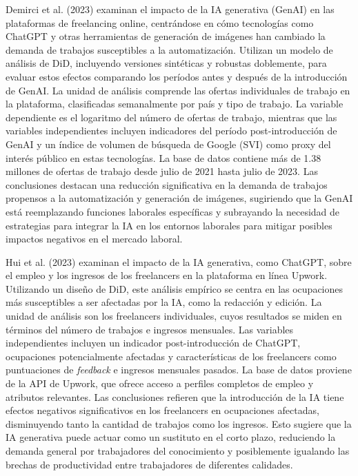 \documentclass[12pt,a4paper]{article}
\begin{document}
Demirci et al. (2023) examinan el impacto de la IA generativa (GenAI) en las plataformas de freelancing online, centrándose en cómo tecnologías como ChatGPT y otras herramientas de generación de imágenes han cambiado la demanda de trabajos susceptibles a la automatización. Utilizan un modelo de análisis de DiD, incluyendo versiones sintéticas y robustas doblemente, para evaluar estos efectos comparando los períodos antes y después de la introducción de GenAI. La unidad de análisis comprende las ofertas individuales de trabajo en la plataforma, clasificadas semanalmente por país y tipo de trabajo. La variable dependiente es el logaritmo del número de ofertas de trabajo, mientras que las variables independientes incluyen indicadores del período post-introducción de GenAI y un índice de volumen de búsqueda de Google (SVI) como proxy del interés público en estas tecnologías. La base de datos contiene más de 1.38 millones de ofertas de trabajo desde julio de 2021 hasta julio de 2023. Las conclusiones destacan una reducción significativa en la demanda de trabajos propensos a la automatización y generación de imágenes, sugiriendo que la GenAI está reemplazando funciones laborales específicas y subrayando la necesidad de estrategias para integrar la IA en los entornos laborales para mitigar posibles impactos negativos en el mercado laboral.


Hui et al. (2023) examinan el impacto de la IA generativa, como ChatGPT, sobre el empleo y los ingresos de los freelancers en la plataforma en línea Upwork. Utilizando un diseño de DiD, este análisis empírico se centra en las ocupaciones más susceptibles a ser afectadas por la IA, como la redacción y edición. La unidad de análisis son los freelancers individuales, cuyos resultados se miden en términos del número de trabajos e ingresos mensuales. Las variables independientes incluyen un indicador post-introducción de ChatGPT, ocupaciones potencialmente afectadas y características de los freelancers como puntuaciones de \textit{feedback} e ingresos mensuales pasados. La base de datos proviene de la API de Upwork, que ofrece acceso a perfiles completos de empleo y atributos relevantes. Las conclusiones refieren que la introducción de la IA tiene efectos negativos significativos en los freelancers en ocupaciones afectadas, disminuyendo tanto la cantidad de trabajos como los ingresos. Esto sugiere que la IA generativa puede actuar como un sustituto en el corto plazo, reduciendo la demanda general por trabajadores del conocimiento y posiblemente igualando las brechas de productividad entre trabajadores de diferentes calidades.
\end{document}
